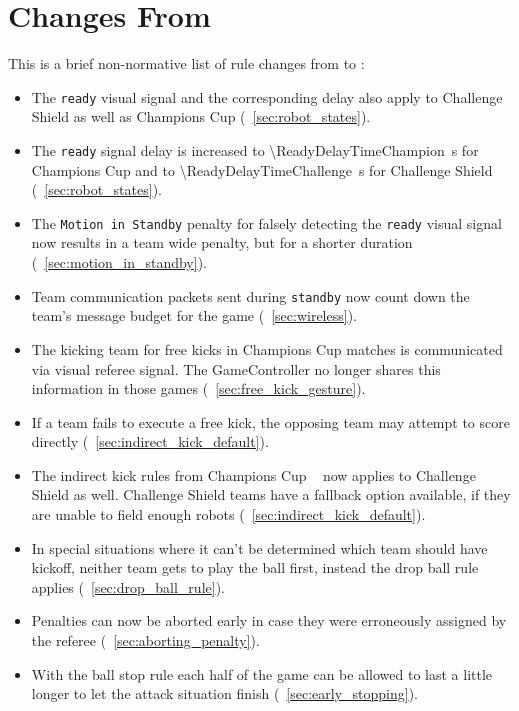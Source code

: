\section{Changes From \LastRCYear}

This is a brief non-normative list of rule changes from \LastRCYear to \RCYear:
\begin{itemize}
  \item The \texttt{ready} visual signal and the corresponding delay
        also apply to Challenge Shield as well as Champions Cup
        (\cf~\cref{sec:robot_states}).
  \item The \texttt{ready} signal delay is increased to
        \qty{\ReadyDelayTimeChampion}{\second} for Champions Cup and to
        \qty{\ReadyDelayTimeChallenge}{\second} for Challenge Shield
        (\cf~\cref{sec:robot_states}).
  \item The \texttt{Motion in Standby} penalty for falsely detecting the
        \texttt{ready} visual signal now results in a team wide penalty,
        but for a shorter duration (\cf~\cref{sec:motion_in_standby}).
  \item Team communication packets sent during \texttt{standby} now count
        down the team's message budget for the game (\cf~\cref{sec:wireless}).
  \item The kicking team for free kicks in Champions Cup matches is communicated
        via visual referee signal. The GameController no longer shares this
        information in those games (\cf~\cref{sec:free_kick_gesture}).
  \item If a team fails to execute a free kick, the opposing team
        may attempt to score directly (\cf~\cref{sec:indirect_kick_default}).
  \item The indirect kick rules from Champions Cup \LastRCYear~ now applies to Challenge Shield as well.
        Challenge Shield teams have a fallback option available, if they
        are unable to field enough robots (\cf~\cref{sec:indirect_kick_default}).
  \item In special situations where it can't be determined
        which team should have kickoff, neither team gets to play the ball first,
        instead the drop ball rule applies (\cf~\cref{sec:drop_ball_rule}).
  \item Penalties can now be aborted early in case they were
        erroneously assigned by the referee (\cf~\cref{sec:aborting_penalty}).
  \item With the ball stop rule each half of the game can be allowed to last
        a little longer to let the attack situation finish (\cf~\cref{sec:early_stopping}).
\end{itemize}
